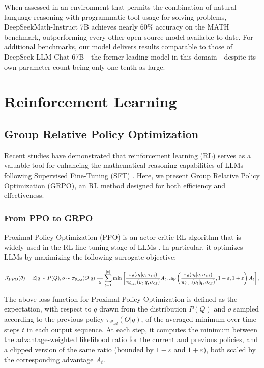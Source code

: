 \begin{itemize}[topsep=0pt]
\begin{itemize}[topsep=0pt]
When assessed in an environment that permits the combination of natural language reasoning with programmatic tool usage for solving problems, DeepSeekMath-Instruct 7B achieves nearly 60\% accuracy on the MATH benchmark, outperforming every other open-source model available to date. For additional benchmarks, our model delivers results comparable to those of DeepSeek-LLM-Chat 67B—the former leading model in this domain—despite its own parameter count being only one-tenth as large.
\section{Reinforcement Learning}

\subsection{Group Relative Policy Optimization} Recent studies have demonstrated that reinforcement learning (RL) serves as a valuable tool for enhancing the mathematical reasoning capabilities of LLMs following Supervised Fine-Tuning (SFT) \citep{wang2023math,wizardmath}. Here, we present Group Relative Policy Optimization (GRPO), an RL method designed for both efficiency and effectiveness.

\subsubsection{From PPO to GRPO} Proximal Policy Optimization (PPO) \citep{schulman2017proximal} is an actor-critic RL algorithm that is widely used in the RL fine-tuning stage of LLMs \citep{ouyang2022training}. In particular, it optimizes LLMs by maximizing the following surrogate objective:

\begin{equation}
\footnotesize
    \mathcal{J}_{PPO}(\theta) = \mathbb{E}{[q \sim P(Q), o \sim \pi_{\theta_{old}}(O|q)]} \frac{1}{|o|} \sum_{t=1}^{|o|} \min \left[ \frac{\pi_\theta(o_{t} | q, o_{<t})}{\pi_{\theta_{old}}(o_{t} | q, o_{<t})} A_{t}, \text{clip} \left( \frac{\pi_\theta(o_{t} | q, o_{<t})}{\pi_{\theta_{old}}(o_{t} | q, o_{<t})}, 1 - \varepsilon, 1 + \varepsilon \right)  A_{t} \right] ,
\end{equation}

The above loss function for Proximal Policy Optimization is defined as the expectation, with respect to $q$ drawn from the distribution $P(Q)$ and $o$ sampled according to the previous policy $\pi_{\theta_{old}}(O|q)$, of the averaged minimum over time steps $t$ in each output sequence. At each step, it computes the minimum between the advantage-weighted likelihood ratio for the current and previous policies, and a clipped version of the same ratio (bounded by $1-\varepsilon$ and $1+\varepsilon$), both scaled by the corresponding advantage $A_t$.


\end{itemize}
\end{itemize}
